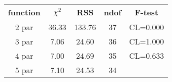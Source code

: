 \begin{tabular}{c|c|c|c|c}
function & $\chi^2$ & RSS & ndof & F-test \\
\hline
2 par & 36.33 & 133.76 & 37 & CL=0.000 \\
3 par & 7.06 & 24.60 & 36 & CL=1.000 \\
4 par & 7.00 & 24.69 & 35 & CL=0.633 \\
5 par & 7.10 & 24.53 & 34 & \\
\hline
\end{tabular}